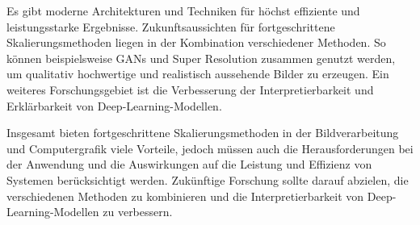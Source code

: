     Es gibt moderne Architekturen und Techniken für höchst effiziente und leistungsstarke Ergebnisse.
    Zukunftsaussichten für fortgeschrittene Skalierungsmethoden liegen in der Kombination verschiedener Methoden. 
    So können beispielsweise GANs und Super Resolution zusammen genutzt werden, um qualitativ hochwertige und realistisch aussehende Bilder zu erzeugen.      
    Ein weiteres Forschungsgebiet ist die Verbesserung der Interpretierbarkeit und Erklärbarkeit von Deep-Learning-Modellen.      
    
    Insgesamt bieten fortgeschrittene Skalierungsmethoden in der Bildverarbeitung und Computergrafik viele Vorteile, jedoch müssen auch die Herausforderungen bei der Anwendung und die Auswirkungen auf die Leistung und Effizienz von Systemen berücksichtigt werden.      
    Zukünftige Forschung sollte darauf abzielen, die verschiedenen Methoden zu kombinieren und die Interpretierbarkeit von Deep-Learning-Modellen zu verbessern.

\newpage